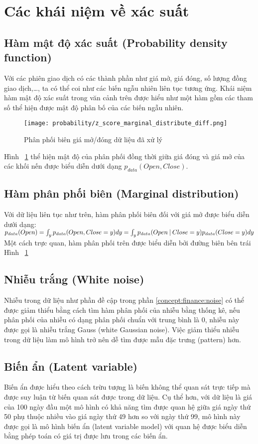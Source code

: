 \section{Các khái niệm về xác suất}
\subsection{Hàm mật độ xác suất (Probability density function)}
Với các phiên giao dịch có các thành phần như giá mở, giá đóng, số lượng đồng giao dịch,\dots, ta có thể coi như các biến ngẫu nhiên liên tục tương ứng. Khái niệm hàm mật độ xác suất trong văn cảnh trên được hiểu như một hàm gồm các tham số thể hiện được mật độ phân bố của các biến ngẫu nhiên.
\begin{figure}[hbt!]
	\center	\texttt{[image: probability/z\_score\_marginal\_distribute\_diff.png]}
	\caption{Phân phối biên giá mở/đóng dữ liệu đã xử lý}
	\label{fig:z_score_marginal_distribution_diff}
\end{figure}
\FloatBarrier
Hình ~\ref{fig:z_score_marginal_distribution_diff} thể hiện mật độ của phân phối đồng thời giữa giá đóng và giá mở của các khối nến được biểu diễn dưới dạng $p_{data}(Open, Close)$.
\subsection{Hàm phân phối biên (Marginal distribution)}
Với dữ liệu liên tục như trên, hàm phân phối biên đối với giá mở được biểu diễn dưới dạng:
$p_{data}(Open) = \int_y p_{data}(Open, Close=y) dy = \int_y p_{data}(Open \:\lvert\: Close=y)p_{data}(Close=y)dy$ Một cách trực quan, hàm phân phối trên được biểu diễn bởi đường biên bên trái Hình ~\ref{fig:z_score_marginal_distribution_diff}

\subsection{Nhiễu trắng (White noise)}
Nhiễu trong dữ liệu như phần đề cập trong phần \ref{concept:finance:noise} có thể được giảm thiểu bằng cách tìm hàm phân phối của nhiễu bằng thống kê, nếu phân phối của nhiễu có dạng phân phối chuẩn với trung bình là 0, nhiễu này được gọi là nhiễu trắng Gauss (white Gaussian noise). Việc giảm thiểu nhiễu trong dữ liệu làm mô hình trở nên dễ tìm được mẫu đặc trưng (pattern) hơn.

\subsection{Biến ẩn (Latent variable)}
Biến ẩn được hiểu theo cách trừu tượng là biến không thể quan sát trực tiếp\cite[trang~264]{bishop} mà được suy luận từ biến quan sát được trong dữ liệu. Cụ thể hơn, với dữ liệu là giá của 100 ngày đầu một mô hình có khả năng tìm được quan hệ giữa giá ngày thứ 50 phụ thuộc nhiều vào giá ngày thứ 49 hơn so với ngày thứ 99, mô hình này được gọi là mô hình biến ẩn (latent variable model) với quan hệ được biểu diễn bằng phép toán có giá trị được lưu trong các biến ẩn.
